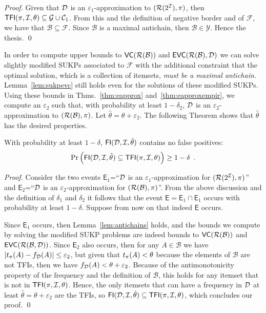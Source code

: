 \begin{proof}
  Given 
  that ${\cal D}$ is an $\varepsilon_1$-approximation to $(\mathcal{R}(2^{\cal I}),\pi)$, then
  $\mathsf{TFI}(\pi,{\cal I},\theta)\subseteq\mathcal{G}\cup\mathcal{C}_1$. 
  From this and the definition of negative border and of $\mathcal{F}$, we have
  that $\mathcal{B}\subseteq\mathcal{F}$. Since $\mathcal{B}$ is a maximal
  antichain, then $\mathcal{B}\in\mathcal{Y}$. Hence the thesis.
  \qed
\end{proof}


In order to compute upper bounds to $\mathsf{VC}(\mathcal{R}(\mathcal{B}))$ and
$\mathsf{EVC}(\mathcal{R}(\mathcal{B}),{\cal D})$ we can solve slightly modified SUKPs 
associated to $\mathcal{F}$ with the additional constraint that the
optimal solution, which is a collection of itemsets, \emph{must be a maximal
antichain}. Lemma~\ref{lem:sukpevc} still holds even for the solutions of these
modified SUKPs. Using these bounds in Thms.~\ref{thm:eapprox}
and~\ref{thm:eapproxempir}, we compute an $\varepsilon_2$ such that, with
probability at least $1-\delta_2$, ${\cal D}$ is an $\varepsilon_2$-approximation to
$(\mathcal{R}(\mathcal{B}),\pi)$. Let $\hat{\theta}=\theta+\varepsilon_2$. The
following Theorem shows that $\hat{\theta}$ has the desired properties.

\begin{theorem}\label{lem:vcfull}
With probability at least $1-\delta$, $\mathsf{FI}({\cal D},{\cal I},\hat\theta)$ contains no false positives:
\[
\Pr\left(\mathsf{FI}({\cal D},{\cal I},\hat\theta)\subseteq\mathsf{TFI}(\pi,{\cal I},\theta)\right)\ge 1-\delta\enspace.\]
\end{theorem}
\begin{proof}
  Consider the two events $\mathsf{E}_1$=``${\cal D}$ is an
  $\varepsilon_1$-approximation for $(\mathcal{R}(2^{\cal I}),\pi)$'' and
  $\mathsf{E}_2$=``${\cal D}$ is an
  $\varepsilon_2$-approximation for $(\mathcal{R}(\mathcal{B}),\pi)$''. From
  the above discussion and the definition of $\delta_1$ and $\delta_2$ it
  follows that the event $\mathsf{E}=\mathsf{E}_1\cap\mathsf{E}_1$ occurs with
  probability at least $1-\delta$. Suppose from now on that indeed $\mathsf{E}$
  occurs.

  Since $\mathsf{E}_1$ occurs, then Lemma~\ref{lem:antichains}
  holds, and the bounds we compute by solving the modified SUKP problems are
  indeed bounds to $\mathsf{VC}(\mathcal{R}(\mathcal{B}))$ and
  $\mathsf{EVC}(\mathcal{R}(\mathcal{B},{\cal D}))$. %
  Since $\mathsf{E}_2$ also occurs, then for any $A\in\mathcal{B}$ we
  have $|t_\pi(A)-f_{\cal D}(A)|\le\varepsilon_2$, but given that $t_\pi(A)<\theta$
  because the elements of $\mathcal{B}$ are not TFIs, then we have
  $f_{\cal D}(A)<\theta+\varepsilon_2$. Because of the antimonotonicity property
  of the frequency and the definition of $\mathcal{B}$, this holds for any
  itemset that is not in $\mathsf{TFI}(\pi,{\cal I},\theta)$. Hence, the only itemsets that can have a
  frequency in ${\cal D}$ at least $\hat{\theta}=\theta+\varepsilon_2$ are the TFIs, so
  $\mathsf{FI}({\cal D},{\cal I},\hat{\theta})\subseteq\mathsf{TFI}(\pi,{\cal I},\theta)$, which concludes
  our proof.
  \qed
\end{proof}


